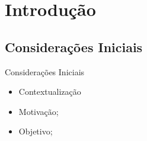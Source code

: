 \renewcommand{\titulo}{Introdução}
\section{\titulo}


\renewcommand{\titulo}{Considerações Iniciais}
\subsection{\titulo}
\begin{frame}{\titulo}
\begin{itemize}
\item Contextualização
\item Motivação;
\item Objetivo;
\end{itemize}
\end{frame}

